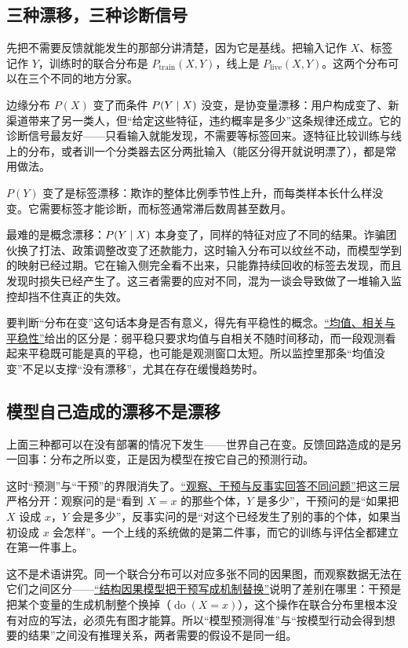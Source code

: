 \subsection{三种漂移，三种诊断信号}

先把不需要反馈就能发生的那部分讲清楚，因为它是基线。把输入记作 \(X\)、标签记作 \(Y\)，训练时的联合分布是 \(P_{\text{train}}(X,Y)\)，线上是 \(P_{\text{live}}(X,Y)\)。这两个分布可以在三个不同的地方分家。

边缘分布 \(P(X)\) 变了而条件 \(P(Y\mid X)\) 没变，是协变量漂移：用户构成变了、新渠道带来了另一类人，但``给定这些特征，违约概率是多少''这条规律还成立。它的诊断信号最友好——只看输入就能发现，不需要等标签回来。逐特征比较训练与线上的分布，或者训一个分类器去区分两批输入（能区分得开就说明漂了），都是常用做法。

\(P(Y)\) 变了是标签漂移：欺诈的整体比例季节性上升，而每类样本长什么样没变。它需要标签才能诊断，而标签通常滞后数周甚至数月。

最难的是概念漂移：\(P(Y\mid X)\) 本身变了，同样的特征对应了不同的结果。诈骗团伙换了打法、政策调整改变了还款能力，这时输入分布可以纹丝不动，而模型学到的映射已经过期。它在输入侧完全看不出来，只能靠持续回收的标签去发现，而且发现时损失已经产生了。这三者需要的应对不同，混为一谈会导致做了一堆输入监控却挡不住真正的失效。

要判断``分布在变''这句话本身是否有意义，得先有平稳性的概念。\hyperref[sec:06-Random-Processes/01-Foundations/03]{``均值、相关与平稳性''}给出的区分是：弱平稳只要求均值与自相关不随时间移动，而一段观测看起来平稳既可能是真的平稳，也可能是观测窗口太短。所以监控里那条``均值没变''不足以支撑``没有漂移''，尤其在存在缓慢趋势时。

\subsection{模型自己造成的漂移不是漂移}

上面三种都可以在没有部署的情况下发生——世界自己在变。反馈回路造成的是另一回事：分布之所以变，正是因为模型在按它自己的预测行动。

这时``预测''与``干预''的界限消失了。\hyperref[sec:13-Machine-Learning/12-Causal-Inference/01]{``观察、干预与反事实回答不同问题''}把这三层严格分开：观察问的是``看到 \(X=x\) 的那些个体，\(Y\) 是多少''，干预问的是``如果把 \(X\) 设成 \(x\)，\(Y\) 会是多少''，反事实问的是``对这个已经发生了别的事的个体，如果当初设成 \(x\) 会怎样''。一个上线的系统做的是第二件事，而它的训练与评估全都建立在第一件事上。

这不是术语讲究。同一个联合分布可以对应多张不同的因果图，而观察数据无法在它们之间区分——\hyperref[sec:13-Machine-Learning/12-Causal-Inference/02]{``结构因果模型把干预写成机制替换''}说明了差别在哪里：干预是把某个变量的生成机制整个换掉（\(\operatorname{do}(X=x)\)），这个操作在联合分布里根本没有对应的写法，必须先有图才能算。所以``模型预测得准''与``按模型行动会得到想要的结果''之间没有推理关系，两者需要的假设不是同一组。

